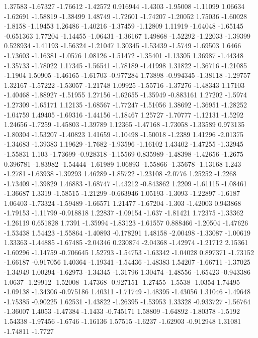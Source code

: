 \documentclass[9pt]{article}
\theoremstyle{plain}
\theoremstyle{definition}
\theoremstyle{remark}
\numberwithin{equation}{section}
\begin{document}
1.37583
-1.67327
-1.76612
-1.42572
0.916944
-1.4303
-1.95008
-1.11099
1.06634
-1.62691
-1.58819
-1.38499
1.48749
-1.72601
-1.74207
-1.20052
1.75036
-1.60028
-1.8158
-1.19453
1.26486
-1.40216
-1.37459
-1.12809
1.11919
-1.64048
-1.65145
-0.651363
1.77204
-1.14455
-1.06431
-1.36167
1.49868
-1.52292
-1.22033
-1.39399
0.528934
-1.41193
-1.56324
-1.21047
1.30345
-1.53439
-1.5749
-1.69503
1.6466
-1.73603
-1.16381
-1.0576
1.08126
-1.51472
-1.35401
-1.13305
1.36987
-1.44348
-1.35733
-1.78022
1.17345
-1.56541
-1.78189
-1.41998
1.31822
-1.36716
-1.21085
-1.1904
1.50905
-1.46165
-1.61703
-0.977284
1.73898
-0.994345
-1.38118
-1.29757
1.32167
-1.57222
-1.53057
-1.21748
1.09925
-1.55716
-1.37276
-1.48343
1.17103
-1.40468
-1.88927
-1.51955
1.27156
-1.62655
-1.35949
-0.883161
1.27202
-1.5974
-1.27309
-1.65171
1.12135
-1.68567
-1.77247
-1.51056
1.38692
-1.36951
-1.28252
-1.04759
1.49405
-1.69316
-1.44156
-1.18467
1.25727
-1.70777
-1.12131
-1.5292
1.24656
-1.7259
-1.45803
-1.39789
1.12365
-1.47168
-1.73058
-1.33589
0.973135
-1.80304
-1.53207
-1.40823
1.41659
-1.10498
-1.50018
-1.2389
1.41296
-2.01375
-1.34683
-1.39383
1.19629
-1.7682
-1.93596
-1.16102
1.43402
-1.47255
-1.32945
-1.55831
1.103
-1.73699
-0.928318
-1.15569
0.835989
-1.48398
-1.42656
-1.2675
0.396781
-1.83982
-1.54444
-1.61989
1.06893
-1.55866
-1.35678
-1.13168
1.243
-1.2781
-1.63938
-1.39293
1.46289
-1.85722
-1.23108
-2.0776
1.25252
-1.2268
-1.73409
-1.39829
1.46883
-1.68747
-1.43212
-0.843862
1.2209
-1.61115
-1.08461
-1.36687
1.3319
-1.58515
-1.21299
-0.663946
1.05193
-1.3093
-1.22897
-1.6187
1.06403
-1.73324
-1.59489
-1.66571
1.21477
-1.67204
-1.303
-1.42003
0.943868
-1.79153
-1.11799
-0.918818
1.22837
-1.09154
-1.637
-1.81421
1.72375
-1.33362
-1.26119
0.651828
1.7391
-1.35994
-1.83123
-1.61557
0.888466
-1.20504
-1.47626
-1.53438
1.54423
-1.55864
-1.40893
-0.178291
1.48158
-2.00498
-1.33087
-1.00619
1.33363
-1.44885
-1.67485
-2.04346
0.230874
-2.04368
-1.42974
-1.21712
2.15361
-1.60296
-1.14759
-0.706645
1.52793
-1.54753
-1.63342
-1.04028
0.897371
-1.73152
-1.66187
-0.917056
1.40364
-1.19341
-1.54436
-1.48383
1.54207
-1.66711
-1.37025
-1.34949
1.00294
-1.62973
-1.34345
-1.31796
1.30474
-1.48556
-1.65423
-0.943386
1.0637
-1.29912
-1.52008
-1.47368
-0.927151
-1.27455
-1.5538
-1.0354
1.74495
-1.09138
-1.34306
-0.975186
1.40311
-1.71749
-1.48395
-1.43056
1.31046
-1.49648
-1.75385
-0.90225
1.62531
-1.43822
-1.26395
-1.53953
1.33328
-0.933727
-1.56764
-1.36007
1.4053
-1.47384
-1.1433
-0.745171
1.58809
-1.64892
-1.80378
-1.5192
1.54338
-1.97456
-1.6746
-1.16136
1.57515
-1.6237
-1.62903
-0.912948
1.31081
-1.74811
-1.7727
\end{document}
